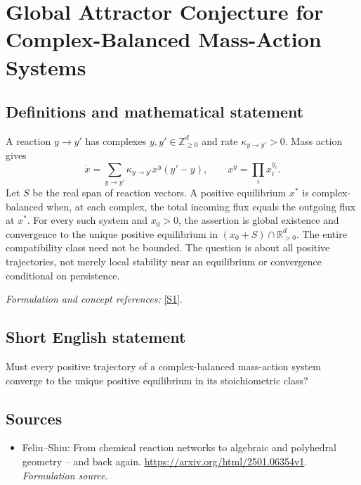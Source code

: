 \documentclass[11pt]{article}
\begin{document}
\section*{\texorpdfstring{Global Attractor Conjecture for Complex-Balanced Mass-Action Systems}{Global Attractor Conjecture for Complex-Balanced Mass-Action Systems}}\label{297}
\subsection{Definitions and mathematical statement}
A reaction $y\to y'$ has complexes $y,y'\in{\mathbb{Z}}_{\ge0}^d$ and rate $\kappa_{y\to y'}>0$. Mass action gives
\[
 \dot x=\sum_{y\to y'}\kappa_{y\to y'}x^y(y'-y),\qquad
 x^y=\prod_i x_i^{y_i}.
\]
Let $S$ be the real span of reaction vectors. A positive equilibrium $x^*$ is complex-balanced when, at each complex, the total incoming flux equals the outgoing flux at $x^*$. For every such system and $x_0>0$, the assertion is global existence and convergence to the unique positive equilibrium in
$(x_0+S)\cap{\mathbb{R}}_{>0}^d$. The entire compatibility class need not be bounded. The question is about all positive trajectories, not merely local stability near an equilibrium or convergence conditional on persistence.
\par\smallskip\textit{Formulation and concept references:} \href{https://arxiv.org/html/2501.06354v1}{[S1]}.

\subsection{Short English statement}
Must every positive trajectory of a complex-balanced mass-action system converge to the unique positive equilibrium in its stoichiometric class?
\subsection{Sources}
\begin{itemize}
\item[S1]Feliu–Shiu: From chemical reaction networks to algebraic and polyhedral geometry – and back again.
\url{https://arxiv.org/html/2501.06354v1}.
\textit{Formulation source.}
\end{itemize}
\end{document}
